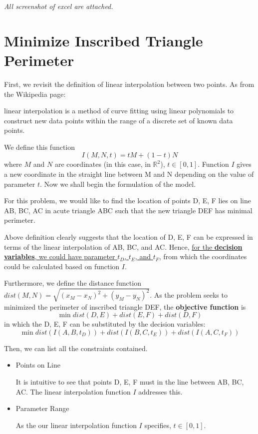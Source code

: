 



\textit{All screenshot of excel are attached.}

\section{Minimize Inscribed Triangle Perimeter} \label{prob1}

First, we revisit the definition of linear interpolation between two points. As from the Wikipedia page:
\begin{displayquote}
linear interpolation is a method of curve fitting using linear polynomials to construct new data points within the range of a discrete set of known data points.
\end{displayquote}
We define this function $$I(M, N, t)= tM + (1 - t)N$$where $M$ and $N$ are coordinates (in this case, in $\mathbb{R}^2$), $t\in[0, 1]$. Function $I$ gives a new coordinate in the straight line between M and N depending on the value of parameter $t$. Now we shall begin the formulation of the model. 

For this problem, we would like to find the location of points D, E, F lies on line AB, BC, AC in acute triangle ABC such that the new triangle DEF has minimal perimeter.

Above definition clearly suggests that the location of D, E, F can be expressed in terms of the linear interpolation of AB, BC, and AC. Hence, \ul{for the \textbf{decision variables}, we could have parameter $t_D$, $t_E$, and $t_F$,} from which the coordinates could be calculated based on function $I$.

Furthermore, we define the distance function $dist(M, N) = \sqrt{(x_M - x_N)^2 + (y_M-y_N)^2}$. As the problem seeks to minimized the perimeter of inscribed triangle DEF, the \textbf{objective function} is 
$$
\min dist(D, E) + dist(E, F) + dist(D, F)
$$
in which the D, E, F can be substituted by the decision variables:
$$
\min dist(I(A, B, t_D)) + dist(I(B, C, t_E)) + dist(I(A, C, t_F))
$$

Then, we can list all the constraints contained.
\begin{itemize}
    \item Points on Line\par
    It is intuitive to see that points D, E, F must in the line between AB, BC, AC. The linear interpolation function $I$ addresses this. 
    
    \item Parameter Range\par
    As the our linear interpolation function $I$ specifies, $t \in [0, 1]$.  
\end{itemize}

